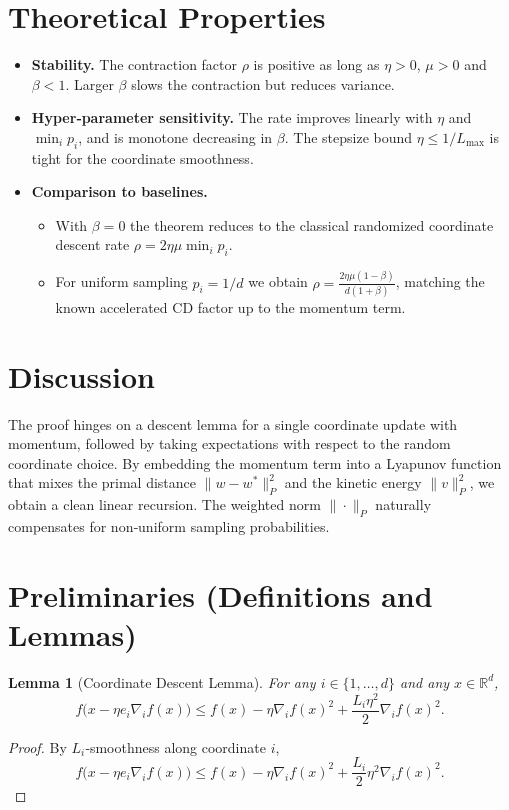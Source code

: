 \documentclass{article}
\newcommand{\R}{\mathbb{R}}
\newtheorem{lemma}{Lemma}
\begin{document}
\section*{Theoretical Properties}
\begin{itemize}
\item \textbf{Stability.} The contraction factor $\rho$ is positive as long as $\eta>0$, $\mu>0$ and $\beta<1$. Larger $\beta$ slows the contraction but reduces variance.
\item \textbf{Hyper‑parameter sensitivity.} The rate improves linearly with $\eta$ and $\min_i p_i$, and is monotone decreasing in $\beta$. The stepsize bound $\eta\le 1/L_{\max}$ is tight for the coordinate smoothness.
\item \textbf{Comparison to baselines.}
\begin{itemize}
\item With $\beta=0$ the theorem reduces to the classical randomized coordinate descent rate $\rho=2\eta\mu\min_i p_i$.
\item For uniform sampling $p_i=1/d$ we obtain $\rho= \frac{2\eta\mu(1-\beta)}{d(1+\beta)}$, matching the known accelerated CD factor up to the momentum term.
\end{itemize}
\end{itemize}

\section*{Discussion}
The proof hinges on a descent lemma for a single coordinate update with momentum, followed by taking expectations with respect to the random coordinate choice. By embedding the momentum term into a Lyapunov function that mixes the primal distance $\|w-w^{*}\|_{P}^{2}$ and the kinetic energy $\|v\|_{P}^{2}$, we obtain a clean linear recursion. The weighted norm $\|\cdot\|_{P}$ naturally compensates for non‑uniform sampling probabilities.

\newpage
\section*{Preliminaries (Definitions and Lemmas)}
\begin{lemma}[Coordinate Descent Lemma]\label{lem:cd}
For any $i\in\{1,\dots ,d\}$ and any $x\in\R^{d}$,
\[
f\bigl(x-\eta e_i \nabla_i f(x)\bigr)
\le f(x)-\eta \nabla_i f(x)^{2}+\frac{L_i\eta^{2}}{2}\nabla_i f(x)^{2}.
\]
\end{lemma}
\begin{proof}
By $L_i$‑smoothness along coordinate $i$,
\[
f\bigl(x-\eta e_i \nabla_i f(x)\bigr)
\le f(x)-\eta \nabla_i f(x)^{2}
+\frac{L_i}{2}\eta^{2}\nabla_i f(x)^{2}.
\]
\end{proof}
\end{document}
